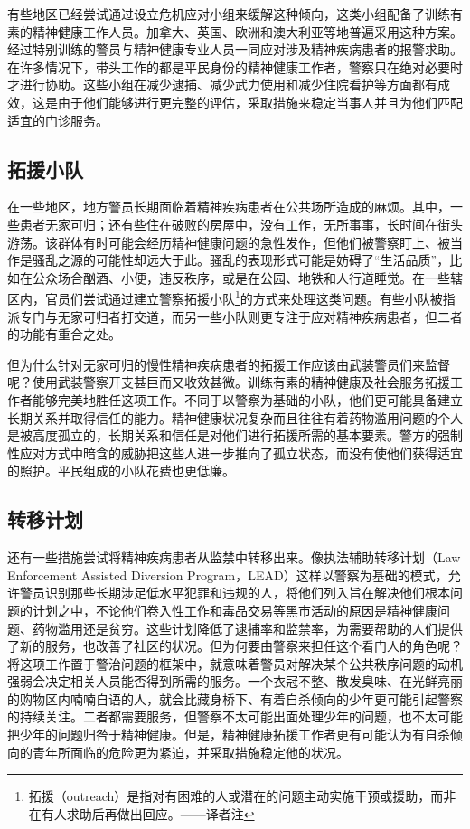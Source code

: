 \documentclass[fontset=fandol, a4paper, 12pt, openright]{ctexbook}
\begin{document}
有些地区已经尝试通过设立危机应对小组来缓解这种倾向，这类小组配备了训练有素的精神健康工作人员。加拿大、英国、欧洲和澳大利亚等地普遍采用这种方案。经过特别训练的警员与精神健康专业人员一同应对涉及精神疾病患者的报警求助。在许多情况下，带头工作的都是平民身份的精神健康工作者，警察只在绝对必要时才进行协助。这些小组在减少逮捕、减少武力使用和减少住院看护等方面都有成效，这是由于他们能够进行更完整的评估，采取措施来稳定当事人并且为他们匹配适宜的门诊服务。

\subsection{拓援小队}
在一些地区，地方警员长期面临着精神疾病患者在公共场所造成的麻烦。其中，一些患者无家可归；还有些住在破败的房屋中，没有工作，无所事事，长时间在街头游荡。该群体有时可能会经历精神健康问题的急性发作，但他们被警察盯上、被当作是骚乱之源的可能性却远大于此。骚乱的表现形式可能是妨碍了“生活品质”，比如在公众场合酗酒、小便，违反秩序，或是在公园、地铁和人行道睡觉。在一些辖区内，官员们尝试通过建立警察拓援小队\footnote{拓援（outreach）是指对有困难的人或潜在的问题主动实施干预或援助，而非在有人求助后再做出回应。——译者注}的方式来处理这类问题。有些小队被指派专门与无家可归者打交道，而另一些小队则更专注于应对精神疾病患者，但二者的功能有重合之处。

但为什么针对无家可归的慢性精神疾病患者的拓援工作应该由武装警员们来监督呢？使用武装警察开支甚巨而又收效甚微。训练有素的精神健康及社会服务拓援工作者能够完美地胜任这项工作。不同于以警察为基础的小队，他们更可能具备建立长期关系并取得信任的能力。精神健康状况复杂而且往往有着药物滥用问题的个人是被高度孤立的，长期关系和信任是对他们进行拓援所需的基本要素。警方的强制性应对方式中暗含的威胁把这些人进一步推向了孤立状态，而没有使他们获得适宜的照护。平民组成的小队花费也更低廉。

\subsection{转移计划}
还有一些措施尝试将精神疾病患者从监禁中转移出来。像执法辅助转移计划（Law Enforcement Assisted Diversion Program，LEAD）这样以警察为基础的模式，允许警员识别那些长期涉足低水平犯罪和违规的人，将他们列入旨在解决他们根本问题的计划之中，不论他们卷入性工作和毒品交易等黑市活动的原因是精神健康问题、药物滥用还是贫穷。这些计划降低了逮捕率和监禁率，为需要帮助的人们提供了新的服务，也改善了社区的状况。但为何要由警察来担任这个看门人的角色呢？将这项工作置于警治问题的框架中，就意味着警员对解决某个公共秩序问题的动机强弱会决定相关人员能否得到所需的服务。一个衣冠不整、散发臭味、在光鲜亮丽的购物区内喃喃自语的人，就会比藏身桥下、有着自杀倾向的少年更可能引起警察的持续关注。二者都需要服务，但警察不太可能出面处理少年的问题，也不太可能把少年的问题归咎于精神健康。但是，精神健康拓援工作者更有可能认为有自杀倾向的青年所面临的危险更为紧迫，并采取措施稳定他的状况。
\end{document}
